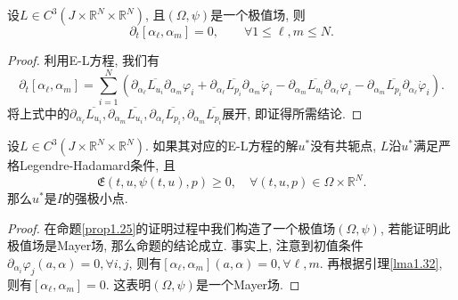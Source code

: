 \begin{lemma}\label{lma1.32}
    设$L \in C^3(J \times \mathbb{R}^N \times \mathbb{R}^N)$, 且$(\Omega, \psi)$是一个极值场, 则 
    \begin{equation*}
        \partial_t[\alpha_\ell, \alpha_m] = 0, \qquad \forall 1 \leq \ell, m \leq N.
    \end{equation*}
    \begin{proof}
        利用E-L方程, 我们有 
        \begin{equation*}
            \partial_t[\alpha_\ell, \alpha_m] = \sum_{i = 1}^N\left(\partial_{\alpha_{\ell}}\overline{L_{u_i}}\partial_{\alpha_m}\varphi_i + \partial_{\alpha_{\ell}}\overline{L_{p_i}}\partial_{\alpha_m}\dot\varphi_i - \partial_{\alpha_m}\overline{L_{u_i}}\partial_{\alpha_{\ell}}\varphi_i - \partial_{\alpha_m}\overline{L_{p_i}}\partial_{\alpha_{\ell}}\dot\varphi_i\right).
        \end{equation*}
        将上式中的$\partial_{\alpha_{\ell}}\overline{L_{u_i}}, \partial_{\alpha_m}\overline{L_{u_i}}, \partial_{\alpha_{\ell}}\overline{L_{p_i}}, \partial_{\alpha_m}\overline{L_{p_i}}$展开, 即证得所需结论.
    \end{proof}
\end{lemma}

\begin{proposition}[充分条件, $N > 1$]
    设$L \in C^3(J \times \mathbb{R}^N \times \mathbb{R}^N)$. 如果其对应的E-L方程的解$u^*$没有共轭点, $L$沿$u^*$满足严格Legendre-Hadamard条件, 且 
    \begin{equation*}
        \mathfrak{E}(t, u, \psi(t, u), p) \geq 0, \quad \forall (t, u, p) \in \Omega \times \mathbb{R}^N. 
    \end{equation*}
    那么$u^*$是$I$的强极小点.
    \begin{proof}
        在命题\ref{prop1.25}的证明过程中我们构造了一个极值场$(\Omega, \psi)$, 若能证明此极值场是Mayer场, 那么命题的结论成立.
        事实上, 注意到初值条件$\partial_{\alpha_i}\varphi_j(a, \alpha) = 0, \forall i, j$, 则有$[\alpha_{\ell}, \alpha_m](a, \alpha) = 0, \forall \ell, m$.
        再根据引理\ref{lma1.32}, 则有$[\alpha_{\ell}, \alpha_m] = 0$. 这表明$(\Omega, \psi)$是一个Mayer场.
    \end{proof}
\end{proposition}

